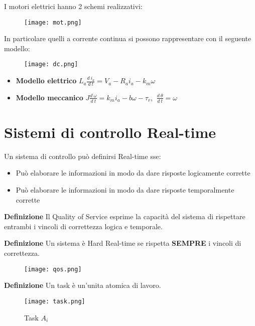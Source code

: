 \documentclass{article}
\newcommand{\df}[1]{\noindent\textbf{Definizione } #1.\newline}
\begin{document}
\noindent I motori elettrici hanno 2 schemi realizzativi:

\begin{figure}[ht]
    \centering
    \texttt{[image: mot.png]}
\end{figure}

\noindent In particolare quelli a corrente continua si possono rappresentare con il seguente modello:

\begin{figure}[ht]
    \centering
    \texttt{[image: dc.png]}
\end{figure}

\begin{itemize}
    \item \textbf{Modello elettrico} $L_a\frac{d\ i_a}{d\ t}=V_a-R_ai_a-k_m\omega$
    \item \textbf{Modello meccanico} $J\frac{d\ \omega}{d\ t}=k_mi_a-b\omega-\tau_r$, $\ \frac{d\ \theta}{d\ t}=\omega$
\end{itemize}

\section{Sistemi di controllo Real-time}

Un sistema di controllo può definirsi Real-time sse:
\begin{itemize}
    \item Può elaborare le informazioni in modo da dare risposte logicamente corrette
    \item Può elaborare le informazioni in modo da dare risposte temporalmente corrette\newline    
\end{itemize}

\df{Il Quality of Service esprime la capacità del sistema di rispettare entrambi i vincoli di correttezza logica e temporale}

\df{Un sistema è Hard Real-time se rispetta \textbf{SEMPRE} i vincoli di correttezza}

\begin{figure}[ht]
    \centering
    \texttt{[image: qos.png]}
\end{figure}

\vspace{5pt}

\df{Un task è un'unita atomica di lavoro}

\begin{figure}[ht]
    \centering
    \texttt{[image: task.png]}
    \caption{Task $A_i$}
\end{figure}
\end{document}
